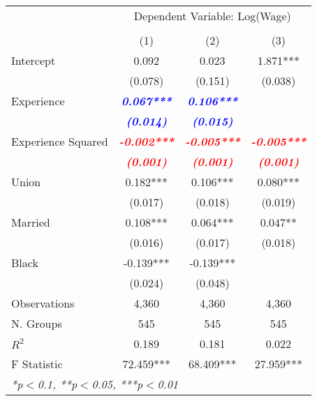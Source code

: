 
\begin{table}[!ht]
  \centering
\begin{tabular}{lccc}
  \toprule
  \toprule
  & \multicolumn{3}{c}{Dependent Variable: Log(Wage)} \\
  \cmidrule(lr){2-4} \\
   & (1) & (2) & (3)\\
  \midrule
  Intercept & 0.092 & 0.023 & 1.871*** \\
   & (0.078) & (0.151) & (0.038) \\
  Experience & \textbf{\textit{\textcolor{blue}{ 0.067***}}} & \textbf{\textit{\textcolor{blue}{ 0.106***}}} &  \\
   & \textbf{\textit{\textcolor{blue}{(0.014)}}} & \textbf{\textit{\textcolor{blue}{(0.015)}}} &  \\
  Experience Squared & \textbf{\textit{\textcolor{red}{-0.002***}}} & \textbf{\textit{\textcolor{red}{-0.005***}}} & \textbf{\textit{\textcolor{red}{-0.005***}}} \\
   & \textbf{\textit{\textcolor{red}{(0.001)}}} & \textbf{\textit{\textcolor{red}{(0.001)}}} & \textbf{\textit{\textcolor{red}{(0.001)}}} \\
  Union & 0.182*** & 0.106*** & 0.080*** \\
   & (0.017) & (0.018) & (0.019) \\
  Married & 0.108*** & 0.064*** & 0.047** \\
   & (0.016) & (0.017) & (0.018) \\
  Black & -0.139*** & -0.139*** &  \\
   & (0.024) & (0.048) &  \\
  \midrule
  Observations & 4,360 & 4,360 & 4,360 \\
  N. Groups & 545 & 545 & 545 \\
  $R^2$ & 0.189 & 0.181 & 0.022 \\
  F Statistic & 72.459*** & 68.409*** & 27.959*** \\
  \bottomrule
  \multicolumn{4}{l}{{\small \textit{*p$<$0.1, **p$<$0.05, ***p$<$0.01}}}\\
\end{tabular}
\end{table}
